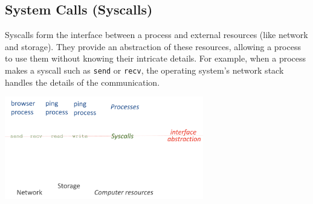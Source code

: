 \subsection{System Calls (Syscalls)}

Syscalls form the interface between a process and external resources (like network and storage). They provide an abstraction of these resources, allowing a process to use them without knowing their intricate details. For example, when a process makes a syscall such as \texttt{send} or \texttt{recv}, the operating system’s network stack handles the details of the communication.

\begin{center}
  \includegraphics[width=0.65\textwidth]{chapters/L1/images/syscalls.png}
\end{center}
\vfill
\newpage
